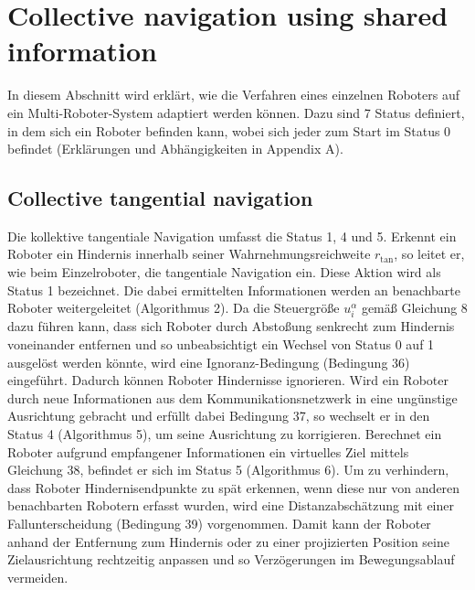 \documentclass[conference]{IEEEtran}
\begin{document}
\section{Collective navigation using shared information}
In diesem Abschnitt wird erklärt, wie die Verfahren eines einzelnen Roboters auf ein 
Multi-Roboter-System adaptiert werden können. Dazu sind 7 Status definiert, in dem 
sich ein Roboter befinden kann, wobei sich jeder zum Start im Status 0 befindet 
(Erklärungen und Abhängigkeiten in Appendix A).

\subsection{Collective tangential navigation}
Die kollektive tangentiale Navigation umfasst die Status 1, 4 und 5. Erkennt ein 
Roboter ein Hindernis innerhalb seiner Wahrnehmungsreichweite \( r_{\mathrm{tan}} \), so leitet er, 
wie beim Einzelroboter, die tangentiale Navigation ein. Diese Aktion wird als 
Status 1 bezeichnet. Die dabei ermittelten Informationen werden an benachbarte 
Roboter weitergeleitet (Algorithmus 2).
Da die Steuergröße \( u_i^\alpha \) gemäß Gleichung 8 dazu führen kann, dass sich Roboter 
durch Abstoßung senkrecht zum Hindernis voneinander entfernen und so unbeabsichtigt 
ein Wechsel von Status 0 auf 1 ausgelöst werden könnte, wird eine Ignoranz-Bedingung 
(Bedingung 36) eingeführt. Dadurch können Roboter Hindernisse ignorieren.
Wird ein Roboter durch neue Informationen aus dem Kommunikationsnetzwerk in eine 
ungünstige Ausrichtung gebracht und erfüllt dabei Bedingung 37, so wechselt er in 
den Status 4 (Algorithmus 5), um seine Ausrichtung zu korrigieren.
Berechnet ein Roboter aufgrund empfangener Informationen ein virtuelles Ziel mittels 
Gleichung 38, befindet er sich im Status 5 (Algorithmus 6).
Um zu verhindern, dass Roboter Hindernisendpunkte zu spät erkennen, wenn diese nur 
von anderen benachbarten Robotern erfasst wurden, wird eine Distanzabschätzung mit 
einer Fallunterscheidung (Bedingung 39) vorgenommen. Damit kann der Roboter anhand 
der Entfernung zum Hindernis oder zu einer projizierten Position seine 
Zielausrichtung rechtzeitig anpassen und so Verzögerungen im Bewegungsablauf vermeiden.
\end{document}
